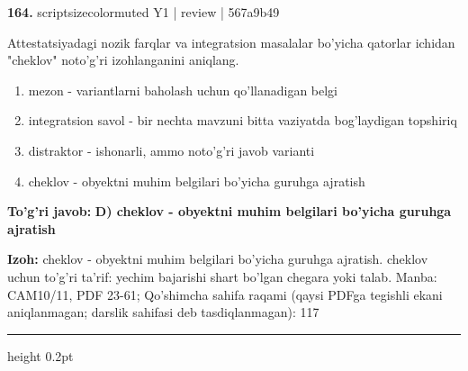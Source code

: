 \documentclass[10pt,a4paper]{article}
\begin{document}
{\bfseries\sffamily\color{ink} 164.} {scriptsizecolor{muted} Y1 | review | 567a9b49}
\par
Attestatsiyadagi nozik farqlar va integratsion masalalar bo'yicha qatorlar ichidan "cheklov" noto'g'ri izohlanganini aniqlang.
\begin{enumerate}[label=\Alph*),leftmargin=9mm]
\item mezon - variantlarni baholash uchun qo'llanadigan belgi
\item integratsion savol - bir nechta mavzuni bitta vaziyatda bog'laydigan topshiriq
\item distraktor - ishonarli, ammo noto'g'ri javob varianti
\item cheklov - obyektni muhim belgilari bo'yicha guruhga ajratish
\end{enumerate}
\begin{tcolorbox}[enhanced,breakable,colback=teal!4,colframe=teal!60!black,boxrule=0.45pt,arc=1.2mm,left=2.7mm,right=2.7mm,top=1.8mm,bottom=1.8mm,before skip=2mm,after skip=2mm]
{\bfseries\sffamily\color{teal}To'g'ri javob:} \textbf{D) cheklov - obyektni muhim belgilari bo'yicha guruhga ajratish}
\par\smallskip
{\bfseries Izoh:} cheklov - obyektni muhim belgilari bo'yicha guruhga ajratish. cheklov uchun to'g'ri ta'rif: yechim bajarishi shart bo'lgan chegara yoki talab. Manba: CAM10/11, PDF 23-61; Qo'shimcha sahifa raqami (qaysi PDFga tegishli ekani aniqlanmagan; darslik sahifasi deb tasdiqlanmagan): 117
\end{tcolorbox}
\vspace{2mm}\hrule height 0.2pt\vspace{3mm}
\end{document}
